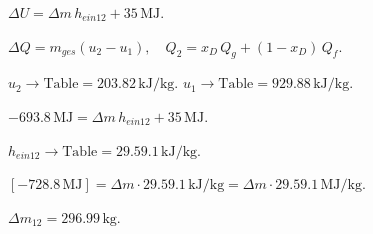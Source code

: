 \( \Delta U = \Delta m \, h_{ein12} + 35 \, \text{MJ} \).  

\( \Delta Q = m_{ges} (u_2 - u_1), \quad Q_2 = x_D \, Q_g + (1 - x_D) \, Q_f \).  

\( u_2 \rightarrow \text{Table} = 203.82 \, \text{kJ/kg} \).  
\( u_1 \rightarrow \text{Table} = 929.88 \, \text{kJ/kg} \).  

\( -693.8 \, \text{MJ} = \Delta m \, h_{ein12} + 35 \, \text{MJ} \).  

\( h_{ein12} \rightarrow \text{Table} = 29.59.1 \, \text{kJ/kg} \).  

\( [-728.8 \, \text{MJ}] = \Delta m \cdot 29.59.1 \, \text{kJ/kg} = \Delta m \cdot 29.59.1 \, \text{MJ/kg} \).  

\( \Delta m_{12} = 296.99 \, \text{kg} \).